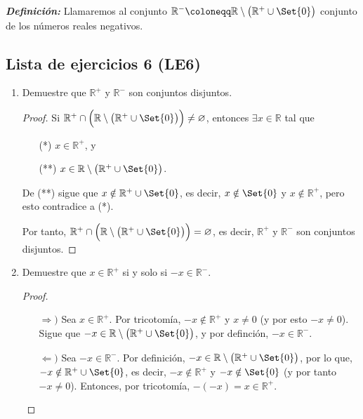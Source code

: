 \documentclass[11pt]{article}
\newcommand{\R}{\mathbb{R}}
\newcommand{\defined}{\coloneqq}
\newcommand{\bfit}[1]{\textbf{\textit{#1}}}
\let\emptyset\varnothing
\let\set\Set
\let\union\cup
\let\intersection\cap
\begin{document}
\bfit{Definición:} Llamaremos al conjunto $\R^-\defined \R\setminus\bigl(\R^+\union \set{0}\bigr)$ conjunto de los números reales negativos.

\subsection*{Lista de ejercicios 6 (LE6)}

\begin{enumerate}[label=\alph*)]
    \item Demuestre que $\R^+$ y $\R^-$ son conjuntos disjuntos.
    \vspace{-1em}
    \begin{proof}%
    Si $\R^+ \intersection \Bigl(\R\setminus\bigl(\R^+\union \set{0}\bigr)\Bigr) \neq \emptyset$, entonces $\exists x\in \R$ tal que \begin{itemize}%
    \item[(*)] $x\in \R^+$, y 
    \item[(**)] $x\in \R\setminus\bigl(\R^+\union \set{0}\bigr)$.
    \end{itemize}  De (**) sigue que $x\notin \R^+\union \set{0}$, es decir, $x\notin \set{0}$ y $x\notin \R^+$, pero esto contradice a (*).

    Por tanto, $\R^+ \intersection \Bigl(\R\setminus\bigl(\R^+\union \set{0}\bigr)\Bigr) = \emptyset$, es decir, $\R^+$ y $\R^-$ son conjuntos disjuntos.
    \end{proof} \vspace{-1em}

    \item Demuestre que $x\in \R^+$ si y solo si $-x\in \R^-$.
    \vspace{-1em}
    \begin{proof}\leavevmode
    \begin{itemize}
    \item[$\Rightarrow)$] Sea $x\in \R^+$. Por tricotomía, $-x\notin \R^+$ y $x\neq 0$ (y por esto $-x\neq 0$). Sigue que $-x\in \R\setminus \bigl(\R^+\union \set{0}\bigr)$, y por definción, $-x\in \R^-$.
    \item[$\Leftarrow)$] Sea $-x\in \R^-$. Por definición, $-x\in \R\setminus\bigl(\R^+\union \set{0}\bigr)$, por lo que, $-x\notin \R^+\union \set{0}$, es decir, $-x\notin \R^+$ y $-x\notin \set{0}$ (y por tanto $-x\neq 0$). Entonces, por tricotomía, $-(-x)=x\in \R^+$. \qedhere
    \end{itemize}
    \end{proof} \vspace{-1em}


\end{enumerate}
\end{document}
